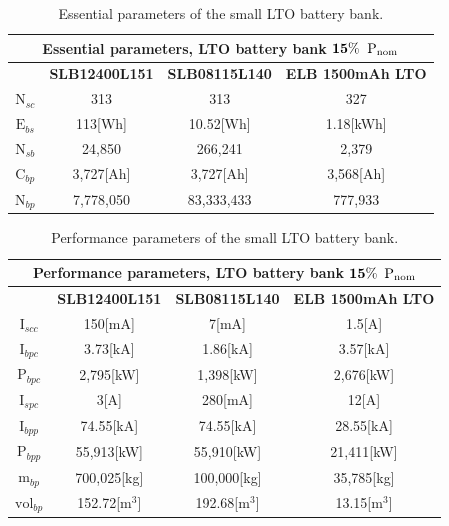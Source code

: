 \begin{table}[H]
	\centering
	\caption{Essential parameters of the small LTO battery bank.}
	\label{tab:LTO_015_1}
	\begin{tabular}{|c|c|c|c|}
		\hline
		\multicolumn{4}{|c|}{\textbf{Essential parameters, LTO battery bank} $\bf 15\%$ ${\bf \text{P}}_{\bf \text{nom}}$} \\
		\hline\hline
		 &  \textbf{SLB12400L151} & \textbf{SLB08115L140} & \textbf{ELB 1500mAh LTO}\\
		 \hline
		$\text{N}_{sc}$ & 313  & 313 & 327 \\	
		\hline
		$\text{E}_{bs}$ &  113[Wh] & 10.52[Wh] & 1.18[kWh]\\	
		\hline
		$\text{N}_{sb}$ &  24,850 & 266,241 & 2,379\\	
		\hline
		$\text{C}_{bp}$ & 3,727[Ah]& 3,727[Ah] & 3,568[Ah]\\	
		\hline
		$\text{N}_{bp}$ & 7,778,050 & 83,333,433 &   777,933  \\	
		\hline		
	\end{tabular}
\end{table}

\begin{table}[H]
	\centering
	\caption{Performance parameters of the small LTO battery bank.}
	\label{tab:LTO_015_2}
	\begin{tabular}{|c|c|c|c|}
		\hline
		\multicolumn{4}{|c|}{\textbf{Performance parameters, LTO battery bank} $\bf 15\%$ ${\bf \text{P}}_{\bf \text{nom}}$} \\
		\hline\hline
		 &  \textbf{SLB12400L151} & \textbf{SLB08115L140} & \textbf{ELB 1500mAh LTO}\\
		 \hline
		$\text{I}_{scc}$ & 150[mA] & 7[mA] & 1.5[A] \\	
		\hline
		$\text{I}_{bpc}$ & 3.73[kA] & 1.86[kA] & 3.57[kA]\\	
		\hline
		$\text{P}_{bpc}$ & 2,795[kW] & 1,398[kW] &   2,676[kW]  \\	
		\hline
		$\text{I}_{spc}$ & 3[A] & 280[mA] & 12[A] \\	
		\hline
		$\text{I}_{bpp}$ & 74.55[kA] & 74.55[kA] & 28.55[kA]  \\	
		\hline
		$\text{P}_{bpp}$ & 55,913[kW] & 55,910[kW] & 21,411[kW]  \\	
		\hline
		$\text{m}_{bp}$ & 700,025[kg]  & 100,000[kg] & 35,785[kg] \\	
		\hline
		$\text{vol}_{bp}$ &  152.72[${\text{m}}^{3}$] & 192.68[${\text{m}}^{3}$] & 13.15[${\text{m}}^{3}$]\\	
		\hline		
	\end{tabular}
\end{table}

